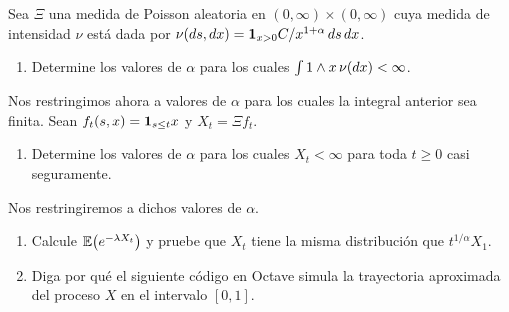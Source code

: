 \begin{problema}
    Sea $\Xi$ una medida de Poisson aleatoria en $(0,\infty)\times (0,\infty)$ cuya 
    medida de intensidad $\nu$ est\'a dada por $\nu\!\left( ds,dx\right) ={\bf{1}}_{x>0}C/x^{1+\alpha}\, ds\,dx$. 
    
    \begin{enumerate}
        \item Determine los valores de $\alpha$ para los cuales $\int 1\wedge x\,\nu\!\left( dx\right) <\infty$. 
    \end{enumerate}
    
    Nos restringimos ahora a valores de $\alpha$ para los cuales la integral anterior sea finita. Sean $f_t\!\left( s,x\right) ={\bf{1}}_{s\leq t}x$ y $X_t=\Xi f_t$. 
    
    \begin{enumerate}[resume]
        \item Determine los valores  de $\alpha$ para los cuales $X_t<\infty$ para toda $t\geq 0$ casi seguramente.
    \end{enumerate}

    Nos restringiremos a dichos valores de $\alpha$. 
    
    \begin{enumerate}[resume]
        \item Calcule $\mathbb{E}\! \left( e^{-\lambda X_t} \right)$ y pruebe que $X_{t}$ tiene la misma distribuci\'on que $t^{1/\alpha}X_1$. 
        \item Diga por qu\'e el siguiente c\'odigo en Octave simula la trayectoria aproximada del proceso $X$ en el intervalo $[0,1]$.
        
    \end{enumerate}
\end{problema}